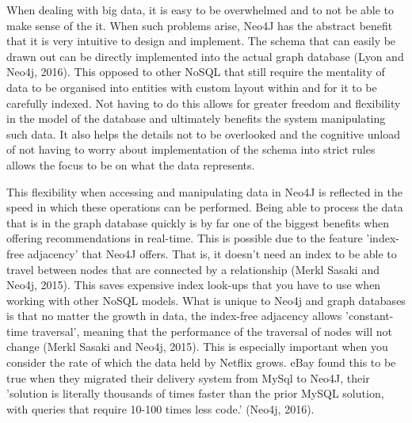 \documentclass[a4paper]{article}
\begin{document}
When dealing with big data, it is easy to be overwhelmed and to not be able to make sense of the it. When such problems arise, Neo4J has the abstract benefit that it is very intuitive to design and implement. The schema that can easily be drawn out can be directly implemented into the actual graph database (Lyon and Neo4j, 2016). This opposed to other NoSQL that still require the mentality of data to be organised into entities with custom layout within and for it to be carefully indexed. Not having to do this allows for greater freedom and flexibility in the model of the database and ultimately benefits the system manipulating such data. It also helps the details not to be overlooked and the cognitive unload of not having to worry about implementation of the schema into strict rules allows the focus to be on what the data represents.\par

This flexibility when accessing and manipulating data in Neo4J is reflected in the speed in which these operations can be performed. Being able to process the data that is in the graph database quickly is by far one of the biggest benefits when offering recommendations in real-time. This is possible due to the feature 'index-free adjacency' that Neo4J offers. That is, it doesn't need an index to be able to travel between nodes that are connected by a relationship (Merkl Sasaki and Neo4j, 2015). This saves expensive index look-ups that you have to use when working with other NoSQL models. What is unique to Neo4j and graph databases is that no matter the growth in data, the index-free adjacency allows 'constant-time traversal', meaning that the performance of the traversal of nodes will not change (Merkl Sasaki and Neo4j, 2015). This is especially important when you consider the rate of which the data held by Netflix grows. eBay found this to be true when they migrated their delivery system from MySql to Neo4J, their 'solution is literally thousands of times faster than the prior MySQL solution, with queries that require 10-100 times less code.' (Neo4j, 2016). \par
\end{document}
